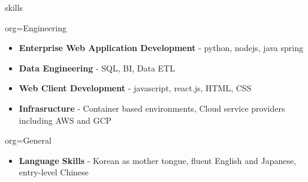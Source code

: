 \documentclass{resume}
\begin{document}
\makeheader

\begin{ResumeSection}{skills}
    \newcommand{\skill}[2]{\textbf{#1} - #2}
    \begin{ResumeSubsection}{org=Engineering}
        \begin{itemize}
            \item \skill{Enterprise Web Application Development}{python, nodejs, java spring}
            \item \skill{Data Engineering}{SQL, BI, Data ETL}
            \item \skill{Web Client Development}{javascript, react.js, HTML, CSS}
            \item \skill{Infrasructure}{Container based environments, Cloud service providers including AWS and GCP}
        \end{itemize}
    \end{ResumeSubsection}
    \begin{ResumeSubsection}{org=General}
        \begin{itemize}
            \item \skill{Language Skills}{Korean as mother tongue, fluent English and Japanese, entry-level Chinese}
        \end{itemize}
    \end{ResumeSubsection}
\end{ResumeSection}
\end{document}
